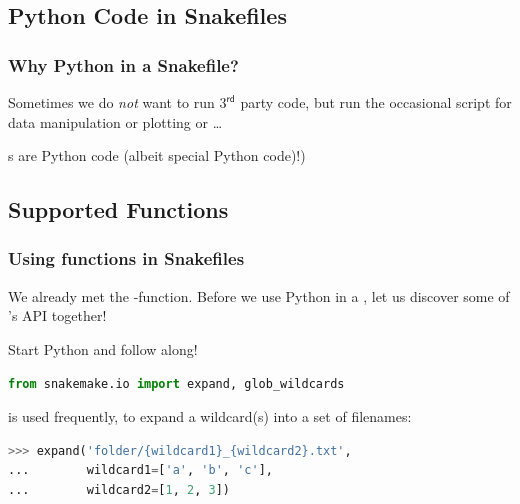 \subsection{Python Code in Snakefiles}

\begin{frame}
  \frametitle{Why Python in a Snakefile?}
  Sometimes we do \emph{not} want to run $3^{\mathsf{rd}}$ party code, but run the occasional script for data manipulation   or plotting or \ldots 
  \pause
  \begin{docs}
  	s are Python code (albeit special Python code)!)
  \end{docs}
\end{frame}

\subsection{Supported Functions}

\begin{frame}[fragile]
  \frametitle{Using functions in Snakefiles}
  We already met the -function. Before we use Python in a , let us discover some of \Snakemake's API together!
  \begin{task}
  	Start Python and follow along!
  \end{task}
  \begin{lstlisting}[language=Python,style=Python]
from snakemake.io import expand, glob_wildcards
  \end{lstlisting}
    is used frequently, to expand a \Snakemake{} wildcard(s) into a set of filenames:
  \begin{lstlisting}[language=Python,style=Python]
>>> expand('folder/{wildcard1}_{wildcard2}.txt',
...        wildcard1=['a', 'b', 'c'],
...        wildcard2=[1, 2, 3])
  \end{lstlisting}
\end{frame}

